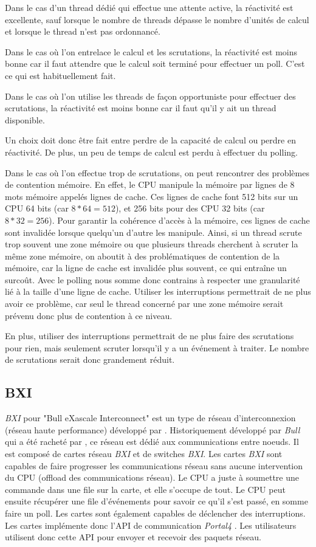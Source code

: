 Dans le cas d'un thread dédié qui effectue une attente active, la réactivité est excellente, sauf lorsque le nombre de threads dépasse le nombre d'unités de calcul et lorsque le thread n'est pas ordonnancé.

Dans le cas où l'on entrelace le calcul et les scrutations, la réactivité est moins bonne car il faut attendre que le calcul soit terminé pour effectuer un poll.
C'est ce qui est habituellement fait.

Dans le cas où l'on utilise les threads de façon opportuniste pour effectuer des scrutations, la réactivité est moins bonne car il faut qu'il y ait un thread disponible.

Un choix doit donc être fait entre perdre de la capacité de calcul ou perdre en réactivité.
De plus, un peu de temps de calcul est perdu à effectuer du polling.

Dans le cas où l'on effectue trop de scrutations, on peut rencontrer des problèmes de contention mémoire.
En effet, le CPU manipule la mémoire par lignes de 8 mots mémoire appelés lignes de cache.
Ces lignes de cache font 512 bits sur un CPU 64 bits (car $8 * 64 = 512$), et 256 bits pour
des CPU 32 bits (car $8 * 32 = 256$).
Pour garantir la cohérence d'accès à la mémoire, ces lignes de cache sont invalidée lorsque quelqu'un d'autre les manipule.
Ainsi, si un thread scrute trop souvent une zone mémoire ou que plusieurs threads cherchent à scruter la même zone mémoire,
on aboutit à des problématiques de contention de la mémoire, car la ligne de cache est invalidée plus souvent, ce qui entraîne un surcoût.
Avec le polling nous somme donc contrains à respecter une granularité lié à la taille d'une ligne de cache.
Utiliser les interruptions permettrait de ne plus avoir ce problème, car seul le thread concerné par une zone mémoire serait prévenu donc plus de contention à ce niveau.

En plus, utiliser des interruptions permettrait de ne plus faire des scrutations pour rien,
mais seulement scruter lorsqu'il y a un événement à traiter.
Le nombre de scrutations serait donc grandement réduit.

\subsection{BXI}

\emph{BXI} \cite{7312662} pour "Bull eXascale Interconnect" est un type de réseau d'interconnexion (réseau haute performance) développé par \atos{}.
Historiquement développé par \emph{Bull} qui a été racheté par \atos{}, ce réseau est dédié aux communications entre noeuds.
Il est composé de cartes réseau \emph{BXI} et de switches \emph{BXI}.
Les cartes \emph{BXI} sont capables de faire progresser les communications réseau sans aucune intervention du CPU (offload des communications réseau).
Le CPU a juste à soumettre une commande dans une file sur la carte, et elle s'occupe de tout.
Le CPU peut ensuite récupérer une file d'événements pour savoir ce qu'il s'est passé, en somme faire un poll.
Les cartes sont également capables de déclencher des interruptions.
Les cartes implémente donc l'API de communication \emph{Portal4} \cite{portals4}.
Les utilisateurs utilisent donc cette API pour envoyer et recevoir des paquets réseau.


